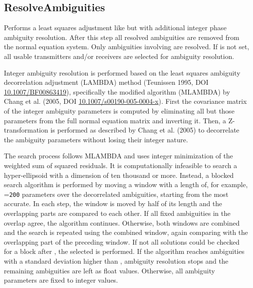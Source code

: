 \subsection{ResolveAmbiguities}\label{gnssProcessingStepType:resolveAmbiguities}
Performs a least squares adjustment like 
but with additional integer phase ambiguity resolution.
After this step all resolved ambiguities are removed from the normal equation system.
Only ambiguities involving  are resolved.
If  is not set, all usable transmitters and/or
receivers are selected for ambiguity resolution.

Integer ambiguity resolution is performed based on the least squares ambiguity decorrelation adjustment
(LAMBDA) method (Teunissen 1995, DOI \href{https://doi.org/10.1007/BF00863419}{10.1007/BF00863419}), specifically
the modified algorithm (MLAMBDA) by Chang et al. (2005, DOI \href{https://doi.org/10.1007/s00190-005-0004-x}{10.1007/s00190-005-0004-x}).
First the covariance matrix of the integer ambiguity parameters is computed by eliminating all but those parameters
from the full normal equation matrix and inverting it. Then, a Z-transformation is performed as described by
Chang et al. (2005) to decorrelate the ambiguity parameters without losing their integer nature.

The search process follows MLAMBDA and uses integer minimization of the weighted sum of squared residuals.
It is computationally infeasible to search a hyper-ellipsoid with a dimension of ten thousand or more.
Instead, a blocked search algorithm is performed by moving a window with a length of, for example,
=\verb|200| parameters over the decorrelated ambiguities, starting from the most accurate.
In each step, the window is moved by half of its length and the overlapping parts are compared to each other.
If all fixed ambiguities in the overlap agree, the algorithm continues.
Otherwise, both windows are combined and the search is repeated using the combined window, again comparing with the overlapping
part of the preceding window. If not all solutions could be checked for a block after ,
the selected  is performed.
If the algorithm reaches ambiguities with a standard deviation higher than ,
ambiguity resolution stops and the remaining ambiguities are left as float values.
Otherwise, all ambiguity parameters are fixed to integer values.

